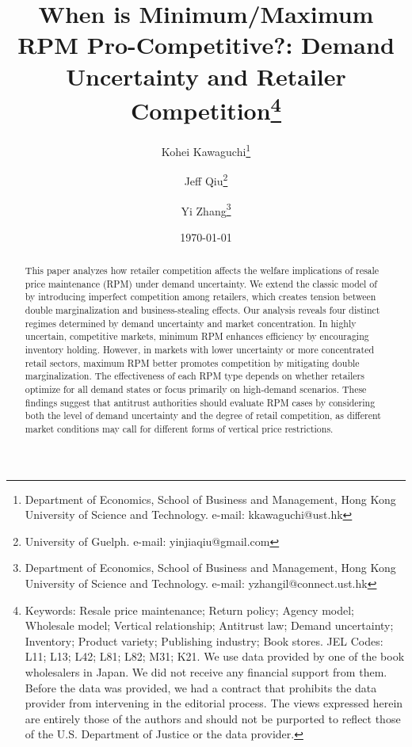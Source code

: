 \documentclass[12pt]{article}
\begin{document}
\begin{titlepage}
\title{When is Minimum/Maximum RPM Pro-Competitive?: Demand Uncertainty and Retailer Competition\thanks{Keywords: Resale price maintenance; Return policy; Agency model; Wholesale model; Vertical relationship; Antitrust law; Demand uncertainty; Inventory; Product variety; Publishing industry; Book stores. JEL Codes: L11; L13; L42; L81; L82; M31; K21. We use data provided by one of the book wholesalers in Japan. We did not receive any financial support from them. Before the data was provided, we had a contract that prohibits the data provider from intervening in the editorial process. The views expressed herein are entirely those of the authors and should not be purported to reflect those of the U.S. Department of Justice or the data provider. }}
\author{
Kohei Kawaguchi\thanks{Department of Economics, School of Business and Management, Hong Kong University of Science and Technology. e-mail: kkawaguchi@ust.hk}
 \and Jeff Qiu\thanks{University of Guelph. e-mail: yinjiaqiu@gmail.com} 
\and Yi Zhang\thanks{Department of Economics, School of Business and Management, Hong Kong University of Science and Technology. e-mail: yzhangil@connect.ust.hk}}
\date{\today}
\maketitle
\begin{abstract}
\noindent
This paper analyzes how retailer competition affects the welfare implications of resale price maintenance (RPM) under demand uncertainty. We extend the classic model of \cite{deneckereDemandUncertaintyPrice1997} by introducing imperfect competition among retailers, which creates tension between double marginalization and business-stealing effects. Our analysis reveals four distinct regimes determined by demand uncertainty and market concentration. In highly uncertain, competitive markets, minimum RPM enhances efficiency by encouraging inventory holding. However, in markets with lower uncertainty or more concentrated retail sectors, maximum RPM better promotes competition by mitigating double marginalization. The effectiveness of each RPM type depends on whether retailers optimize for all demand states or focus primarily on high-demand scenarios. These findings suggest that antitrust authorities should evaluate RPM cases by considering both the level of demand uncertainty and the degree of retail competition, as different market conditions may call for different forms of vertical price restrictions.

\end{abstract}
\end{titlepage}
\end{document}
